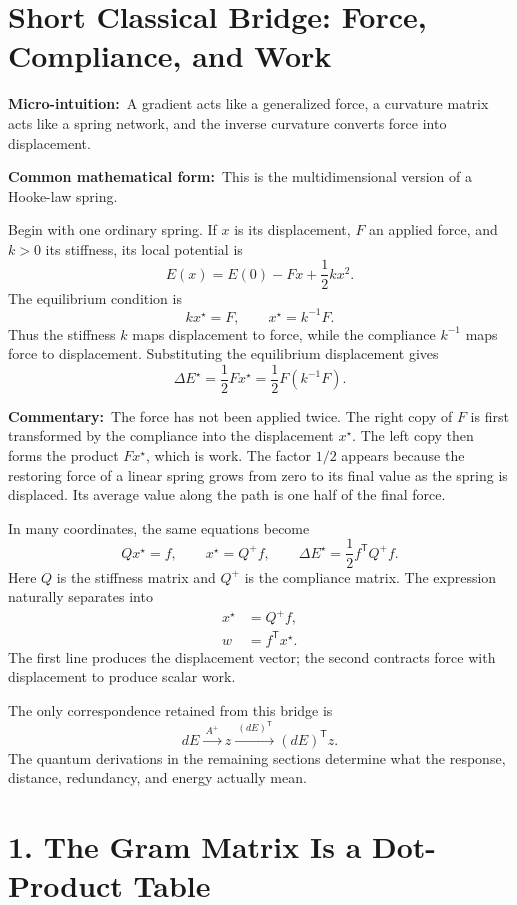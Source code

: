 \documentclass[10pt,twocolumn]{article}
\newcommand{\micro}[1]{\par\noindent\textbf{Micro-intuition:}\ #1\par}
\newcommand{\form}[1]{\par\noindent\textbf{Common mathematical form:}\ #1\par}
\newcommand{\commentary}[1]{\par\noindent\textbf{Commentary:}\ #1\par}
\newcommand{\conceptbreak}{\par\medskip\noindent{\color{black!30}\rule{\columnwidth}{0.35pt}}\par\medskip}
\begin{document}
\conceptbreak

\section*{Short Classical Bridge: Force, Compliance, and Work}

\micro{A gradient acts like a generalized force, a curvature matrix acts like
a spring network, and the inverse curvature converts force into displacement.}

\form{This is the multidimensional version of a Hooke-law spring.}

Begin with one ordinary spring. If \(x\) is its displacement, \(F\) an applied
force, and \(k>0\) its stiffness, its local potential is
\[
E(x)=E(0)-Fx+\frac12kx^2.
\]
The equilibrium condition is
\[
kx^\star=F,
\qquad
x^\star=k^{-1}F.
\]
Thus the stiffness \(k\) maps displacement to force, while the compliance
\(k^{-1}\) maps force to displacement. Substituting the equilibrium
displacement gives
\[
\boxed{
\Delta E^\star
=\frac12F x^\star
=\frac12F(k^{-1}F).
}
\]

\commentary{The force has not been applied twice. The right copy of \(F\) is
first transformed by the compliance into the displacement \(x^\star\). The
left copy then forms the product \(F x^\star\), which is work. The factor
\(1/2\) appears because the restoring force of a linear spring grows from zero
to its final value as the spring is displaced. Its average value along the
path is one half of the final force.}

In many coordinates, the same equations become
\[
Qx^\star=f,
\qquad
x^\star=Q^+f,
\qquad
\boxed{\Delta E^\star=\frac12 f^{\mathsf T}Q^+f.}
\]
Here \(Q\) is the stiffness matrix and \(Q^+\) is the compliance matrix. The
expression naturally separates into
\[
\begin{aligned}
x^\star&=Q^+f,\\
w&=f^{\mathsf T}x^\star.
\end{aligned}
\]
The first line produces the displacement vector; the second contracts force
with displacement to produce scalar work.

The only correspondence retained from this bridge is
\[
dE\xrightarrow{\ A^+\ }z
\xrightarrow{\ (dE)^{\mathsf T}\ }(dE)^{\mathsf T}z.
\]
The quantum derivations in the remaining sections determine what the response,
distance, redundancy, and energy actually mean.

\section*{1. The Gram Matrix Is a Dot-Product Table}
\end{document}
